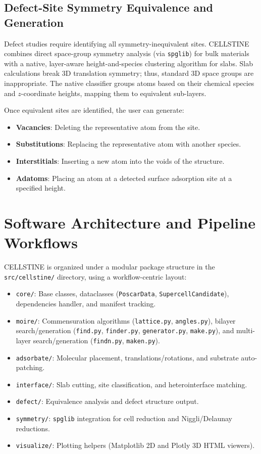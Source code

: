 \documentclass[9pt,a4paper,twoside]{tau-class/tau}
\begin{document}
\subsection{Defect-Site Symmetry Equivalence and Generation}
Defect studies require identifying all symmetry-inequivalent sites. CELLSTINE combines direct space-group symmetry analysis (via \texttt{spglib}) for bulk materials with a native, layer-aware height-and-species clustering algorithm for slabs. Slab calculations break 3D translation symmetry; thus, standard 3D space groups are inappropriate. The native classifier groups atoms based on their chemical species and $z$-coordinate heights, mapping them to equivalent sub-layers.

Once equivalent sites are identified, the user can generate:
\begin{itemize}[leftmargin=*]
    \item \textbf{Vacancies}: Deleting the representative atom from the site.
    \item \textbf{Substitutions}: Replacing the representative atom with another species.
    \item \textbf{Interstitials}: Inserting a new atom into the voids of the structure.
    \item \textbf{Adatoms}: Placing an atom at a detected surface adsorption site at a specified height.
\end{itemize}

\section{Software Architecture and Pipeline Workflows}
\label{sec:architecture}

CELLSTINE is organized under a modular package structure in the \texttt{src/cellstine/} directory, using a workflow-centric layout:
\begin{itemize}[leftmargin=*]
    \item \texttt{core/}: Base classes, dataclasses (\texttt{PoscarData}, \texttt{SupercellCandidate}), dependencies handler, and manifest tracking.
    \item \texttt{moire/}: Commensuration algorithms (\texttt{lattice.py}, \texttt{angles.py}), bilayer search/generation (\texttt{find.py}, \texttt{finder.py}, \texttt{generator.py}, \texttt{make.py}), and multi-layer search/generation (\texttt{findn.py}, \texttt{maken.py}).
    \item \texttt{adsorbate/}: Molecular placement, translations/rotations, and substrate auto-patching.
    \item \texttt{interface/}: Slab cutting, site classification, and heterointerface matching.
    \item \texttt{defect/}: Equivalence analysis and defect structure output.
    \item \texttt{symmetry/}: \texttt{spglib} integration for cell reduction and Niggli/Delaunay reductions.
    \item \texttt{visualize/}: Plotting helpers (Matplotlib 2D and Plotly 3D HTML viewers).
\end{itemize}
\end{document}
